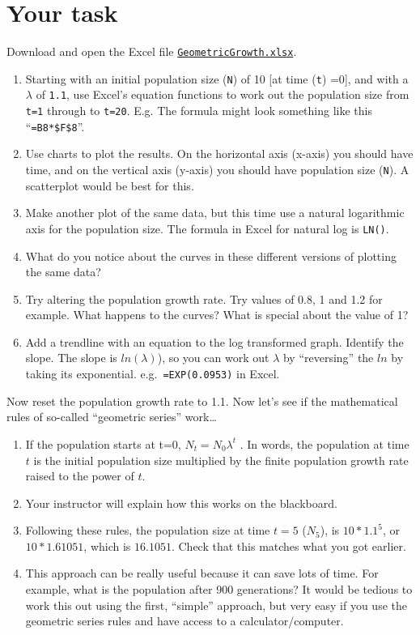 \documentclass[
  a4paper]{book}
\providecommand{\tightlist}{%
  \setlength{\itemsep}{0pt}\setlength{\parskip}{0pt}}
\begin{document}
\section{Your task}\label{your-task-2}

Download and open the Excel file \href{https://www.dropbox.com/s/xxx05sckvop5i52/GeometricGrowth.xlsx?dl=1}{\texttt{GeometricGrowth.xlsx}}.

\begin{enumerate}
\def\labelenumi{\arabic{enumi}.}
\tightlist
\item
  Starting with an initial population size (\texttt{N}) of 10 {[}at time (\texttt{t}) =0{]}, and with a \(\lambda\) of \texttt{1.1}, use Excel's equation functions to work out the population size from \texttt{t=1} through to \texttt{t=20}. E.g. The formula might look something like this ``\texttt{=B8*\$F\$8}''.
\item
  Use charts to plot the results. On the horizontal axis (x-axis) you should have time, and on the vertical axis (y-axis) you should have population size (\texttt{N}). A scatterplot would be best for this.
\item
  Make another plot of the same data, but this time use a natural logarithmic axis for the population size. The formula in Excel for natural log is \texttt{LN()}.
\item
  What do you notice about the curves in these different versions of plotting the same data?
\item
  Try altering the population growth rate. Try values of 0.8, 1 and 1.2 for example. What happens to the curves? What is special about the value of 1?
\item
  Add a trendline with an equation to the log transformed graph. Identify the slope. The slope is \(ln(\lambda)\)), so you can work out \(\lambda\) by ``reversing'' the \(ln\) by taking its exponential. e.g.~\texttt{=EXP(0.0953)} in Excel.
\end{enumerate}

Now reset the population growth rate to 1.1. Now let's see if the mathematical rules of so-called ``geometric series'' work\ldots{}

\begin{enumerate}
\def\labelenumi{\arabic{enumi}.}
\tightlist
\item
  If the population starts at t=0, \(N_t = N_0 \lambda^t\) . In words, the population at time \(t\) is the initial population size multiplied by the finite population growth rate raised to the power of \(t\).
\item
  Your instructor will explain how this works on the blackboard.
\item
  Following these rules, the population size at time \(t=5\) (\(N_5\)), is \(10 * 1.1^5\), or \(10* 1.61051\), which is \(16.1051\). Check that this matches what you got earlier.
\item
  This approach can be really useful because it can save lots of time. For example, what is the population after 900 generations? It would be tedious to work this out using the first, ``simple'' approach, but very easy if you use the geometric series rules and have access to a calculator/computer.
\end{enumerate}
\end{document}
